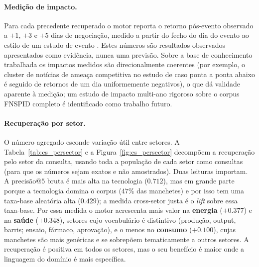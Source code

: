 \paragraph{Medição de impacto.}
Para cada precedente recuperado o motor reporta o retorno pós-evento observado a $+1$, $+3$ e $+5$ dias de
negociação, medido a partir do fecho do dia do evento ao estilo de um estudo de evento
\autocite{brown1985daily}. Estes números são resultados observados apresentados como evidência, nunca uma
previsão. Sobre a base de conhecimento trabalhada os impactos medidos são direcionalmente coerentes (por
exemplo, o cluster de notícias de ameaça competitiva no estudo de caso ponta a ponta abaixo é seguido de
retornos de um dia uniformemente negativos), o que dá validade aparente à medição; um estudo de impacto
multi-ano rigoroso sobre o corpus FNSPID completo é identificado como trabalho futuro.

\paragraph{Recuperação por setor.}
O número agregado esconde variação útil entre setores. A Tabela~\ref{tab:cs_persector} e a
Figura~\ref{fig:cs_persector} decompõem a recuperação pelo setor da consulta, usando toda a população de cada
setor como consultas (para que os números sejam exatos e não amostrados). Duas leituras importam. A precisão@$5$
bruta é mais alta na tecnologia ($0.712$), mas em grande parte porque a tecnologia domina o corpus ($47\%$ das
manchetes) e por isso tem uma taxa-base aleatória alta ($0.429$); a medida cross-setor justa é o \emph{lift}
sobre essa taxa-base. Por essa medida o motor acrescenta mais valor na \textbf{energia} ($+0.377$) e na
\textbf{saúde} ($+0.348$), setores cujo vocabulário é distintivo (produção, output, barris; ensaio, fármaco,
aprovação), e o menos no \textbf{consumo} ($+0.100$), cujas manchetes são mais genéricas e se sobrepõem
tematicamente a outros setores. A recuperação é positiva em todos os setores, mas o seu benefício é maior onde
a linguagem do domínio é mais específica.

